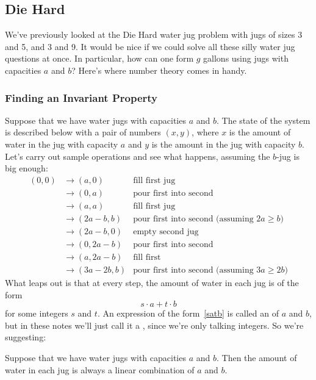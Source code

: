 
\subsection{Die Hard}

We've previously looked at the Die Hard water jug problem with jugs of
sizes 3 and 5, and 3 and 9.  It would be nice if we could solve all these
silly water jug questions at once.  In particular, how can one form $g$
gallons using jugs with capacities $a$ and $b$?  Here's where number
theory comes in handy.

\subsubsection{Finding an Invariant Property}

Suppose that we have water jugs with capacities $a$ and $b$.  The state of
the system is described below with a pair of numbers $(x, y)$, where $x$
is the amount of water in the jug with capacity $a$ and $y$ is the amount
in the jug with capacity $b$.  Let's carry out sample operations and see
what happens, assuming the $b$-jug is big enough:
%
\begin{align*}
(0,0)
& \rightarrow (a,0) & \text{fill first jug} \\
& \rightarrow (0,a) & \text{pour first into second} \\
& \rightarrow (a, a) & \text{fill first jug} \\
& \rightarrow (2a-b, b) & \text{pour first into second (assuming $2a \geq b$)} \\
& \rightarrow (2a-b, 0) & \text{empty second jug} \\
& \rightarrow (0, 2a-b) & \text{pour first into second} \\
& \rightarrow (a, 2a-b) & \text{fill first} \\
& \rightarrow (3a-2b, b) & \text{pour first into second (assuming $3a \geq 2b$)}
\end{align*}
%
What leaps out is that at every step, the amount of water in each jug is
of the form
%
\begin{equation}\label{satb}
s \cdot a + t \cdot b
\end{equation}
%
for some integers $s$ and $t$.  An expression of the form~\eqref{satb} is
called an  of $a$ and $b$, but in these
notes we'll just call it a , since we're only
talking integers.  So we're suggesting:
\begin{lemma}
\label{lem:waterjugs}
Suppose that we have water jugs with capacities $a$ and $b$.  Then the
amount of water in each jug is always a linear combination of $a$ and
$b$.
\end{lemma}

